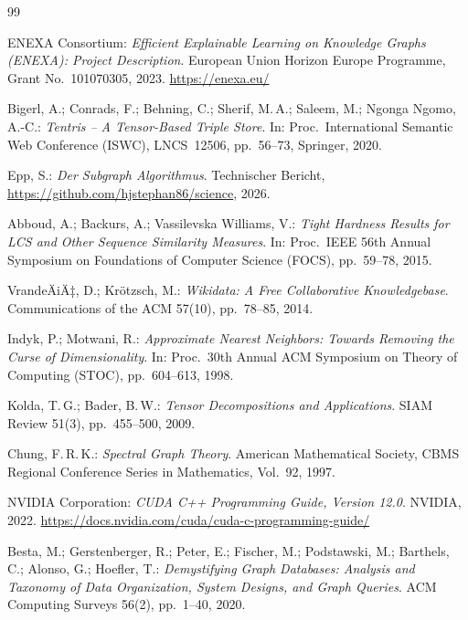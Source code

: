 ﻿\documentclass[a4paper,12pt]{article}
\theoremstyle{definition}
\begin{document}
\begin{thebibliography}{99}

ENEXA Consortium: \textit{Efficient Explainable Learning on Knowledge Graphs (ENEXA):
Project Description}. European Union Horizon Europe Programme, Grant No.\ 101070305, 2023.
\url{https://enexa.eu/}

Bigerl, A.; Conrads, F.; Behning, C.; Sherif, M.\,A.; Saleem, M.; Ngonga Ngomo, A.-C.:
\textit{Tentris -- A Tensor-Based Triple Store}. In: Proc.\ International Semantic Web
Conference (ISWC), LNCS~12506, pp.\ 56--73, Springer, 2020.

Epp, S.: \textit{Der Subgraph Algorithmus}. Technischer Bericht,
\url{https://github.com/hjstephan86/science}, 2026.

Abboud, A.; Backurs, A.; Vassilevska Williams, V.:
\textit{Tight Hardness Results for LCS and Other Sequence Similarity Measures}.
In: Proc.\ IEEE 56th Annual Symposium on Foundations of Computer Science (FOCS),
pp.\ 59--78, 2015.

VrandeÄiÄ‡, D.; Krötzsch, M.:
\textit{Wikidata: A Free Collaborative Knowledgebase}.
Communications of the ACM 57(10), pp.\ 78--85, 2014.

Indyk, P.; Motwani, R.:
\textit{Approximate Nearest Neighbors: Towards Removing the Curse of Dimensionality}.
In: Proc.\ 30th Annual ACM Symposium on Theory of Computing (STOC),
pp.\ 604--613, 1998.

Kolda, T.\,G.; Bader, B.\,W.:
\textit{Tensor Decompositions and Applications}.
SIAM Review 51(3), pp.\ 455--500, 2009.

Chung, F.\,R.\,K.:
\textit{Spectral Graph Theory}.
American Mathematical Society, CBMS Regional Conference Series in Mathematics, Vol.\ 92, 1997.

NVIDIA Corporation:
\textit{CUDA C++ Programming Guide, Version 12.0}. NVIDIA, 2022.
\url{https://docs.nvidia.com/cuda/cuda-c-programming-guide/}

Besta, M.; Gerstenberger, R.; Peter, E.; Fischer, M.; Podstawski, M.; Barthels, C.;
Alonso, G.; Hoefler, T.:
\textit{Demystifying Graph Databases: Analysis and Taxonomy of Data Organization,
System Designs, and Graph Queries}.
ACM Computing Surveys 56(2), pp.\ 1--40, 2020.


\end{thebibliography}
\end{document}
